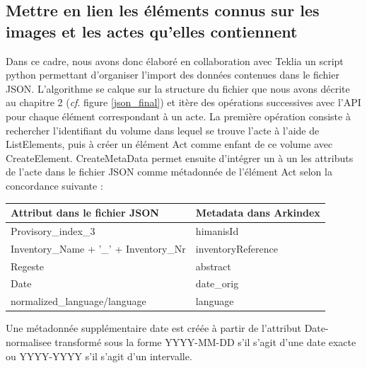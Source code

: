 \documentclass[a4paper,12pt,twoside]{book}
\begin{document}
	\subsection{Mettre en lien les éléments connus sur les images et les actes qu'elles contiennent}
	
	Dans ce cadre, nous avons donc élaboré en collaboration avec Teklia un script python permettant d'organiser l'import des données contenues dans le fichier JSON. L'algorithme se calque sur la structure du fichier que nous avons décrite au chapitre 2 (\textit{cf}. figure \ref{json_final}) et itère des opérations successives avec l'API pour chaque élément correspondant à un acte. La première opération consiste à rechercher l'identifiant du volume dans lequel se trouve l'acte à l'aide de ListElements, puis à créer un élément Act comme enfant de ce volume avec CreateElement. CreateMetaData permet ensuite d'intégrer un à un les attributs de l'acte dans le fichier JSON comme métadonnée de l'élément Act selon la concordance suivante :
	
	\begin{center}
		\begin{tabular}{|p{8cm}|p{8cm}|}
			\hline
			Attribut dans le fichier JSON & Metadata dans Arkindex\\
			\hline\hline
			Provisory\_index\_3 & himanisId \\ \hline
			Inventory\_Name + '\_' + Inventory\_Nr & inventoryReference \\ \hline
			Regeste & abstract \\ \hline
			Date & date\_orig \\ \hline
			normalized\_language/language & language \\ \hline
		\end{tabular}
	\end{center}

	\noindent Une métadonnée supplémentaire \og date\fg{} est créée à partir de l'attribut \og Date-normalisee\fg{} transformé sous la forme YYYY-MM-DD s'il s'agit d'une date exacte ou YYYY-YYYY s'il s'agit d'un intervalle.
	
\end{document}
